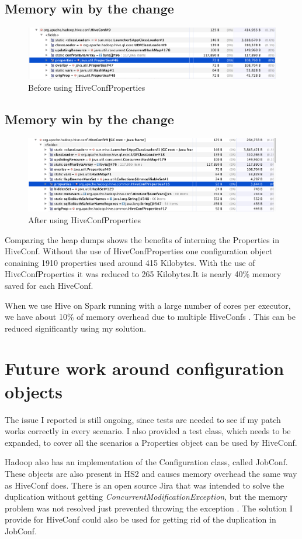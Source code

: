 \subsection{Memory win by the change}
\begin{figure}[H]
	\includegraphics[width=150mm, keepaspectratio]{figures/hiveconf_orig.png}
	\centering
	\caption{Before using HiveConfProperties}
\end{figure}

\subsection{Memory win by the change}
\begin{figure}[H]
	\includegraphics[width=150mm, keepaspectratio]{figures/hiveconf_interned.png}
	\centering
	\caption{After using HiveConfProperties}
\end{figure}

Comparing the heap dumps shows the benefits of interning the Properties in HiveConf. Without the use of HiveConfProperties one configuration object conaining 1910 properties used around 415 Kilobytes. With the use of HiveConfProperties it was reduced to 265 Kilobytes.It is nearly 40\% memory saved for each HiveConf. 

When we use Hive on Spark running with a large number of cores per executor, we have about 10\% of memory overhead due to multiple HiveConfs . This can be reduced significantly using my solution. 

\section{Future work around configuration objects}
The issue I reported is  still ongoing, since tests are needed to see if my patch works correctly in every scenario. I also provided a test class, which needs to be expanded, to cover all the scenarios a Properties object can be used by HiveConf. 

Hadoop also has an implementation of the Configuration class, called JobConf. These objects are also present in HS2 and causes memory overhead the same way as HiveConf does. There is an open source Jira that was intended to solve the duplication without getting \textit{ConcurrentModificationException}, but the memory problem was not resolved just prevented throwing the exception \cite{hive-jobconf}. The solution I provide for HiveConf could also be used for getting rid of the duplication in JobConf.